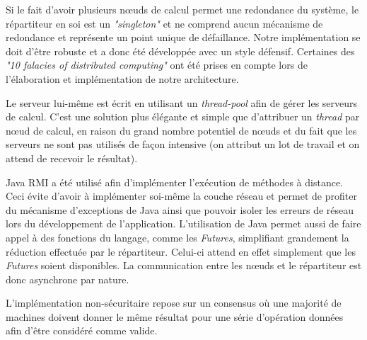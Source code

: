 Si le fait d'avoir plusieurs nœuds de calcul permet une redondance du système, le répartiteur en soi est un \emph{"singleton"} et 
ne comprend aucun mécanisme de redondance et représente un point unique de défaillance. Notre implémentation se doit d'être robuste et 
a donc été développée avec un style défensif. Certaines des \emph{"10 falacies of distributed computing"} ont été prises en compte lors de l'élaboration et implémentation
de notre architecture. 

Le serveur lui-même est écrit en utilisant un \emph{thread-pool} afin de gérer les serveurs de calcul. C'est une solution plus élégante et simple que 
d'attribuer un \emph{thread} par nœud de calcul, en raison du grand nombre potentiel de nœuds et du fait que les serveurs ne sont pas utilisés de façon intensive 
(on attribut un lot de travail et on attend de recevoir le résultat). 

Java RMI a été utilisé afin d'implémenter l'exécution de méthodes à distance. Ceci évite d'avoir à implémenter soi-même la couche réseau et permet
de profiter du mécanisme d'exceptions de Java ainsi que pouvoir isoler les erreurs de réseau lors du développement de l'application. L'utilisation 
de Java permet aussi de faire appel à des fonctions du langage, comme les \emph{Futures}, simplifiant grandement la réduction effectuée par le répartiteur. Celui-ci
attend en effet simplement que les \emph{Futures} soient disponibles. La communication entre les nœuds et le répartiteur est donc asynchrone par nature.  

L'implémentation non-sécuritaire repose sur un consensus où une majorité de machines doivent donner le même résultat pour une série d'opération données 
afin d'être considéré comme valide. 

